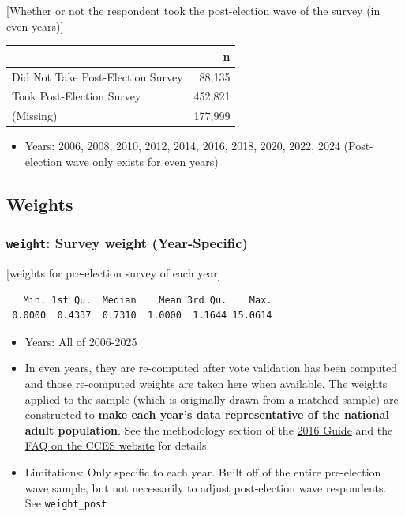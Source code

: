\documentclass[10pt,article,oneside]{memoir}
\begin{document}
{[}Whether or not the respondent took the post-election wave of the
survey (in even years){]}

\begin{table}[H]
\centering
\begin{tabular}[t]{lr}
\toprule
 & n\\
\midrule
Did Not Take Post-Election Survey & 88,135\\
Took Post-Election Survey & 452,821\\
(Missing) & 177,999\\
\bottomrule
\end{tabular}
\end{table}

\begin{itemize}
\tightlist
\item
  Years: 2006, 2008, 2010, 2012, 2014, 2016, 2018, 2020, 2022, 2024
  (Post-election wave only exists for even years)
\end{itemize}

\FloatBarrier

\subsection{Weights}\label{weights}

\subsubsection{\texorpdfstring{\texttt{weight}: Survey weight
(Year-Specific)}{weight: Survey weight (Year-Specific)}}\label{weight-survey-weight-year-specific}

{[}weights for pre-election survey of each year{]}

\begin{verbatim}
   Min. 1st Qu.  Median    Mean 3rd Qu.    Max. 
 0.0000  0.4337  0.7310  1.0000  1.1644 15.0614 
\end{verbatim}

\begin{itemize}
\tightlist
\item
  Years: All of 2006-2025
\item
  In even years, they are re-computed after vote validation has been
  computed and those re-computed weights are taken here when available.
  The weights applied to the sample (which is originally drawn from a
  matched sample) are constructed to \textbf{make each year's data
  representative of the national adult population}. See the methodology
  section of the
  \href{https://dataverse.harvard.edu/api/access/datafile/3047286}{2016
  Guide} and the
  \href{https://cces.gov.harvard.edu/frequently-asked-questions}{FAQ on
  the CCES website} for details.
\item
  Limitations: Only specific to each year. Built off of the entire
  pre-election wave sample, but not necessarily to adjust post-election
  wave respondents. See \texttt{weight\_post}
\end{itemize}
\end{document}
